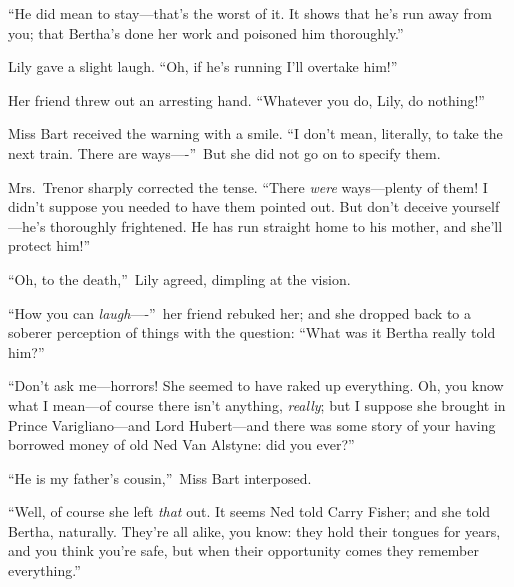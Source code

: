 \documentclass[12pt,a4paper]{book}
\begin{document}
``He did mean to stay---that's the worst of it. It shows that he's
run away from you; that Bertha's done her work and poisoned him
thoroughly.''





Lily gave a slight laugh. ``Oh, if he's running I'll overtake
him!''





Her friend threw out an arresting hand. ``Whatever you do, Lily,
do nothing!''





Miss Bart received the warning with a smile. ``I don't mean,
literally, to take the next train. There are ways----''\ But she did
not go on to specify them.





Mrs.\ Trenor sharply corrected the tense. ``There \textit{were} ways---plenty
of them! I didn't suppose you needed to have them pointed out. 
But don't deceive yourself---he's thoroughly frightened. He has
run straight home to his mother, and she'll protect him!''





``Oh, to the death,''\ Lily agreed, dimpling at the vision.





``How you can \textit{laugh}----''\ her friend rebuked her; and she dropped
back to a soberer perception of things with the question: ``What
was it Bertha really told him?''





``Don't ask me---horrors! She seemed to have raked up everything. 
Oh, you know what I mean---of course there isn't anything, \textit{really};
but I suppose she brought in Prince Varigliano---and Lord
Hubert---and there was some story of your having borrowed money of
old Ned Van Alstyne: did you ever?''





``He is my father's cousin,''\ Miss Bart interposed.





``Well, of course she left \textit{that} out. It seems Ned told Carry
Fisher; and she told Bertha, naturally. They're all alike, you
know: they hold their tongues for years, and you think you're
safe, but when their opportunity comes they remember everything.''
\end{document}
